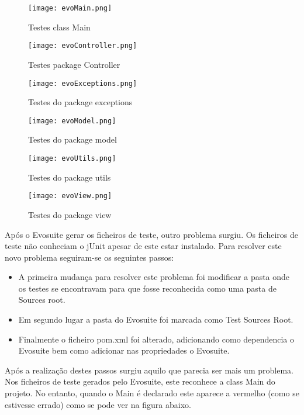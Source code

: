 \begin{figure}[H]

  \centering

  \texttt{[image: evoMain.png]}

  \caption {Testes class Main}

  \texttt{[image: evoController.png]}

  \caption {Testes package Controller}

  \texttt{[image: evoExceptions.png]}

  \caption {Testes do package exceptions}
  \label {fig35}

\end{figure}  
\begin{figure}[H]

  \centering
  \texttt{[image: evoModel.png]}

  \caption {Testes do package model}

  \texttt{[image: evoUtils.png]}

  \caption {Testes do package utils}
  \texttt{[image: evoView.png]}

  \caption {Testes do package view}

  \label {fig36}

\end{figure}

\par Após o Evosuite gerar os ficheiros de teste, outro problema surgiu. Os ficheiros de teste não conheciam o jUnit apesar de este estar instalado. Para resolver este novo problema seguiram-se os seguintes passos:
\begin{itemize}
\item A primeira mudança para resolver este problema foi modificar a pasta onde os testes se encontravam para que fosse reconhecida como uma pasta de Sources root.
\item Em segundo lugar a pasta do Evosuite foi marcada como Test Sources Root.
\item Finalmente o ficheiro pom.xml foi alterado, adicionando como dependencia o Evosuite bem como adicionar nas propriedades o Evosuite.
\end{itemize}

\par Após a realização destes passos surgiu aquilo que parecia ser mais um problema. Nos ficheiros de teste gerados pelo Evosuite, este reconhece a class Main do projeto. No entanto, quando o Main é declarado este aparece a vermelho (como se estivesse errado) como se pode ver na figura abaixo.


